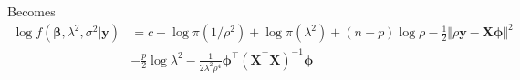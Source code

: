 Becomes
\begin{align*}
	\log f(\boldsymbol{\beta}, \lambda^2, \sigma^2 | \mathbf y)
	&= c + \log \pi(1/\rho^2) + \log \pi(\lambda^2) + (n-p) \log \rho - \frac{1}{2} \Vert \rho\mathbf y - \mathbf X \boldsymbol{\phi} \Vert^2 \\
	&  - \frac{p}{2} \log \lambda^2 -\frac{1}{2\lambda^2\rho^4} \boldsymbol{\phi}^\top (\mathbf X^\top \mathbf X)^{-1} \boldsymbol{\phi} 
\end{align*}


%
%
%












